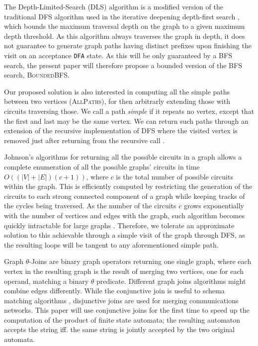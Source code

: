 \documentclass[sigconf]{acmart}
\begin{document}
The Depth-Limited-Search (DLS) algorithm is a modified version of the traditional DFS algorithm used in the iterative deepening depth-first search \cite{DBLP:journals/ai/Korf85}, which  bounds the maximum traversal depth on the graph to a given maximum depth threshold. As this algorithm always traverses the graph in depth, it does not guarantee to generate graph paths having distinct prefixes upon finishing the visit on an acceptance \texttt{DFA} state. As this will be only guaranteed by a BFS search, the present paper will therefore propose a bounded version of the BFS search, \textsc{BoundedBFS}.

Our proposed solution is also interested in computing all the simple paths between two vertices (\textsc{AllPaths}), for then arbitrarly extending those with circuits traversing those. We call a path \textit{simple} if it repeats no vertex, except that the first and last may be the same vertex. We can return such paths through an extension of the recursive implementation of DFS where the visited vertex is removed just after returning from the recursive call \cite{ASPNIST}. 


Johnson's algorithms for returning all the possible circuits in a graph \cite{doi:10.1137/0204007} allows a complete enumeration of all the possible graphs' circuits in time $O((|V|+|E|)(c+1))$, where $c$ is the total number of possible circuits within the graph. This is efficiently computed by restricting the generation of the circuits to each strong connected component of a graph while keeping tracks of the cycles being traversed. As the number of the circuits $c$ grows exponentially with the number of vertices and edges with the graph, such algorithm becomes quickly intractable for large graphs \cite{DBLP:conf/fcs/HawickJ08}. Therefore, we tolerate an approximate solution to this achievable through a simple visit of the graph through DFS, as the resulting loops will be tangent to any aforementioned simple path. 

Graph $\theta$-Joins \cite{DBLP:conf/ideas/Bergami21} are binary graph  operators returning one single graph, where each vertex in the resulting graph is the result of merging two vertices, one for each operand, matching a binary $\theta$ predicate. Different graph joins algorithms might combine edges differently. While the conjunctive join is useful to schema matching algorithms \cite{DBLP:books/sp/Melnik04}, disjunctive joins are used for merging communications networks. This paper will use conjunctive joins for the first time to speed up the computation of the product of finite state automata; the resulting automaton accepts the string iff. the same string is jointly accepted by the two original automata. %
\end{document}
